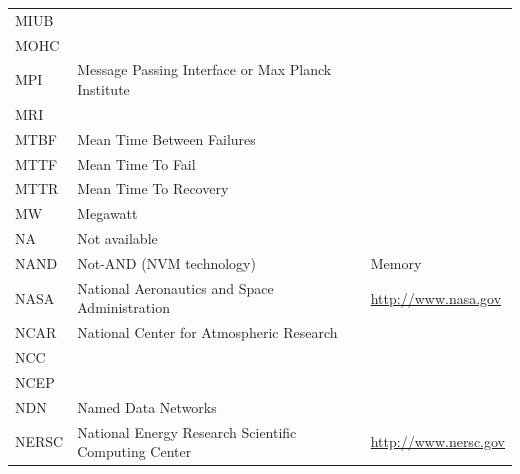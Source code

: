 \documentclass{../../template/esiwace-report}
\begin{document}
\begin{longtable}{|l|l|l|}
  MIUB        &                                                       &                                       \\
  MOHC        &                                                       &                                       \\
  MPI         &  Message Passing Interface or Max Planck Institute &                                   \\
  MRI         &                                                       &                                       \\
  MTBF        &       Mean Time Between Failures                      &                                       \\
  MTTF        &       Mean Time To Fail                               &                                       \\
  MTTR        &         Mean Time To Recovery                         &                                       \\
  MW          &         Megawatt                                      &                                       \\
  NA          &         Not available                                 &                                       \\
  NAND        &       Not-AND (NVM technology)                        &         Memory                        \\
  NASA        &         National Aeronautics and Space Administration &  \url{http://www.nasa.gov}                  \\
  NCAR        &         National Center for Atmospheric Research      &                                       \\
  NCC         &                                                       &                                       \\
  NCEP        &                                                       &                                       \\
  NDN         &         Named Data Networks                           &                                       \\
  NERSC       &         National Energy Research Scientific Computing Center & \url{http://www.nersc.gov}                  \\

\end{longtable}
\end{document}

